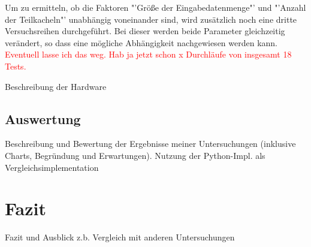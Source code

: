 Um zu ermitteln, ob die Faktoren "'Größe der Eingabedatenmenge"' und "'Anzahl der Teilkacheln"' unabhängig voneinander sind, wird zusätzlich noch eine dritte Versuchsreihen durchgeführt. Bei dieser werden beide Parameter gleichzeitig verändert, so dass eine mögliche Abhängigkeit nachgewiesen werden kann. \textcolor{red}{Eventuell lasse ich das weg. Hab ja jetzt schon x Durchläufe von insgesamt 18 Tests.}

Beschreibung der Hardware

\section{Auswertung}
Beschreibung und Bewertung der Ergebnisse meiner Untersuchungen (inklusive Charts, Begründung und Erwartungen). Nutzung der Python-Impl. als Vergleichsimplementation

\chapter{Fazit}
Fazit und Ausblick
z.b. Vergleich mit anderen Untersuchungen

